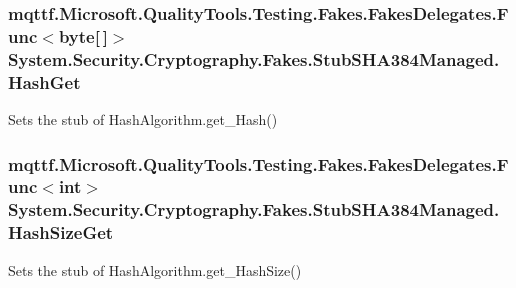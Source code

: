 \hypertarget{class_system_1_1_security_1_1_cryptography_1_1_fakes_1_1_stub_s_h_a384_managed_ac088e936e6fe25d17491bb9d1d9bee3b}{
\subsubsection[{Hash\-Get}]{\setlength{\rightskip}{0pt plus 5cm}mqttf.\-Microsoft.\-Quality\-Tools.\-Testing.\-Fakes.\-Fakes\-Delegates.\-Func$<$byte\mbox{[}$\,$\mbox{]}$>$ System.\-Security.\-Cryptography.\-Fakes.\-Stub\-S\-H\-A384\-Managed.\-Hash\-Get}}\label{class_system_1_1_security_1_1_cryptography_1_1_fakes_1_1_stub_s_h_a384_managed_ac088e936e6fe25d17491bb9d1d9bee3b}


Sets the stub of Hash\-Algorithm.\-get\-\_\-\-Hash()

\hypertarget{class_system_1_1_security_1_1_cryptography_1_1_fakes_1_1_stub_s_h_a384_managed_a62835357b9e16badaf09a1e32e2719db}{
\subsubsection[{Hash\-Size\-Get}]{\setlength{\rightskip}{0pt plus 5cm}mqttf.\-Microsoft.\-Quality\-Tools.\-Testing.\-Fakes.\-Fakes\-Delegates.\-Func$<$int$>$ System.\-Security.\-Cryptography.\-Fakes.\-Stub\-S\-H\-A384\-Managed.\-Hash\-Size\-Get}}\label{class_system_1_1_security_1_1_cryptography_1_1_fakes_1_1_stub_s_h_a384_managed_a62835357b9e16badaf09a1e32e2719db}


Sets the stub of Hash\-Algorithm.\-get\-\_\-\-Hash\-Size()

